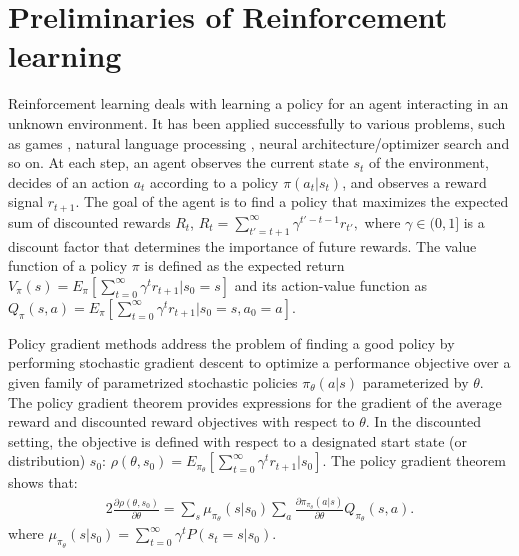 \documentclass{article}
\begin{document}
\section{Preliminaries of Reinforcement learning}
\label{sec:pre}
Reinforcement learning \cite{sutton1} deals with learning a policy for an
agent interacting in an unknown environment. It has been applied successfully to various problems, such as games \cite{minh1,silver1}, natural language processing \cite{yu1}, neural architecture/optimizer search \cite{zoph1,bello1} and so on. At each step,
an agent observes the current state $s_t$ of the environment,
decides of an action $a_t$ according to a policy $\pi(a_t | s_t)$, and observes
a reward signal $r_{t+1}$. The goal of the agent is to find a policy
that maximizes the expected sum of discounted rewards $R_t$,
$R_t = \sum_{t'=t+1}^\infty \gamma^{t'-t-1 }r_{t'},$
where $\gamma \in (0,1]$ is a discount factor that determines the importance of
future rewards.
 The value function of a policy $\pi$ is defined as the expected return $V_{\pi}(s) = E_\pi[\sum_{t=0}^\infty\gamma^{t}r_{t+1}|s_0 = s]$ and its action-value function as $Q_{\pi}(s,a) = E_\pi[\sum_{t=0}^\infty\gamma^{t}r_{t+1}|s_0 = s, a_0 =a]$.

Policy gradient methods address the problem of finding a good policy by performing stochastic gradient descent to optimize a performance objective over a given family of parametrized stochastic policies $\pi_\theta (a|s)$ parameterized by $\theta$. The policy
gradient theorem \cite{sutton2} provides expressions for the gradient of the average reward and discounted reward objectives with respect to $\theta$. In the discounted setting, the objective is defined with respect to a designated start state (or distribution) $s_0$: $\rho(\theta,s_0) = E_{\pi_\theta}[\sum_{t=0}^\infty\gamma^{t}r_{t+1}|s_0 ]$. The policy gradient theorem shows
that:
\begin{alignat}{2}  %
\label{eq01}
\frac{\partial \rho(\theta,s_0)}{\partial \theta} = \sum_s \mu_{\pi_\theta}(s|s_0)\sum_a\frac{\partial \pi_{\pi_\theta}(a|s)}{\partial \theta}Q_{\pi_\theta}(s,a).
\end{alignat}
where $\mu_{\pi_\theta}(s|s_0)= \sum_{t=0}^\infty\gamma^tP(s_t = s|s_0) $.
\end{document}
